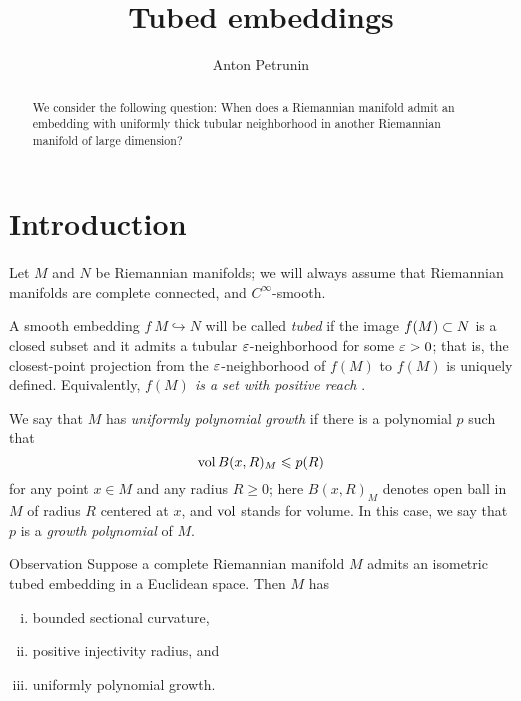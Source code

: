 \documentclass[a4paper,10pt]{article}
\def\thetitle{Tubed embeddings}
\def\theauthors{Anton Petrunin}
\begin{document}


\title{\thetitle}
\author{\theauthors}
\date{}
\maketitle

\begin{abstract}
We consider the following question:
When does a Riemannian manifold admit an embedding with uniformly thick tubular neighborhood in another Riemannian manifold of large dimension?
\end{abstract}

\section*{Introduction}

\paragraph{}\label{par:Observation}
Let $M$ and $N$ be Riemannian manifolds; we will always assume that Riemannian manifolds are complete connected, and $C^\infty$-smooth.

A smooth embedding $f\:M\hookrightarrow N$ will be called \emph{tubed} if the image $f(M)\z\subset N$ is a closed subset and it admits a tubular $\varepsilon$-neighborhood for some $\varepsilon>0$;
that is, the closest-point projection from the $\varepsilon$-neighborhood of $f(M)$ to $f(M)$ is uniquely defined.
Equivalently, \textit{$f(M)$ is a set with positive reach} \cite{federer,bangert}.

We say that $M$ has \emph{uniformly polynomial growth} if there is a polynomial $p$ such that 
\[\operatorname{\rm vol} B(x,R)_M\leqslant p(R)\]
for any point $x\in M$ and any radius $R\ge 0$;
here $B(x,R)_M$ denotes open ball in $M$ of radius $R$ centered at $x$, and $\operatorname{\rm vol}$ stands for volume.
In this case, we say that $p$ is a \emph{growth polynomial} of $M$.

\begin{thm}{Observation}
Suppose a complete Riemannian manifold $M$ admits an isometric tubed embedding in a Euclidean space.
Then $M$ has
\begin{enumerate}[(i)]
\item bounded sectional curvature,
\item positive injectivity radius, and
\item\label{uniformly polynomial growth} uniformly  polynomial growth.
\end{enumerate}
\end{thm}
\end{document}
